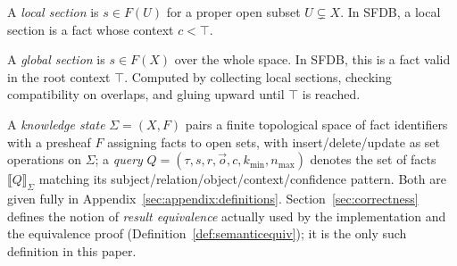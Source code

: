\begin{definition}
\label{def:localsection}
A \emph{local section} is $s \in F(U)$ for a proper open subset $U \subsetneq X$.
In SFDB, a local section is a fact whose context $c < \top$.
\end{definition}

\begin{definition}
\label{def:globalsection}
A \emph{global section} is $s \in F(X)$ over the whole space.
In SFDB, this is a fact valid in the root context $\top$.
Computed by collecting local sections, checking compatibility on overlaps,
and gluing upward until $\top$ is reached.
\end{definition}

A \emph{knowledge state} $\Sigma = (X, F)$ pairs a finite topological space
of fact identifiers with a presheaf $F$ assigning facts to open sets, with
insert/delete/update as set operations on $\Sigma$; a \emph{query}
$Q = (\tau, s, r, \vec{o}, c, k_{\min}, n_{\max})$ denotes the set of facts
$\llbracket Q \rrbracket_\Sigma$ matching its subject/relation/object/context/confidence
pattern. Both are given fully in Appendix~\ref{sec:appendix:definitions}.
Section~\ref{sec:correctness} defines the notion of \emph{result
equivalence} actually used by the implementation and the equivalence
proof (Definition~\ref{def:semanticequiv}); it is the only such
definition in this paper.
